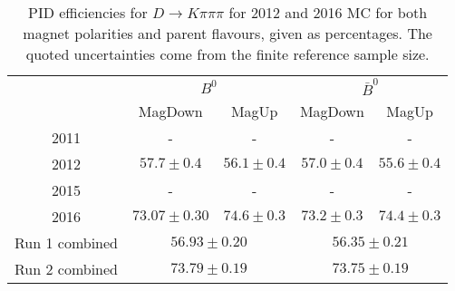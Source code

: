 \begin{table}[H]
    \centering
    \begin{tabular}{ccccc}
        \toprule
        & \multicolumn{2}{c}{$B^0$} &  \multicolumn{2}{c}{$\bar{B}^0$}\\
        & MagDown & MagUp & MagDown & MagUp\\
        \midrule
2011 & - & - & - & - \\
2012 & $57.7 \pm 0.4$ & $56.1 \pm 0.4$ & $57.0 \pm 0.4$ & $55.6 \pm 0.4$ \\
2015 & - & - & - & - \\
2016 & $73.07 \pm 0.30$ & $74.6 \pm 0.3$ & $73.2 \pm 0.3$ & $74.4 \pm 0.3$ \\
        \midrule
Run 1 combined & \multicolumn{2}{c}{$56.93 \pm 0.20$} & \multicolumn{2}{c}{$56.35 \pm 0.21$} \\
Run 2 combined & \multicolumn{2}{c}{$73.79 \pm 0.19$} & \multicolumn{2}{c}{$73.75 \pm 0.19$} \\
        \bottomrule
    \end{tabular}
    \caption{PID efficiencies for $D \to K\pi\pi\pi$ for 2012 and 2016 MC for both magnet polarities and parent flavours, given as percentages. The quoted  uncertainties come from the finite reference sample size.}
\label{tab:PID_efficiency_Kpipipi}
\end{table}
